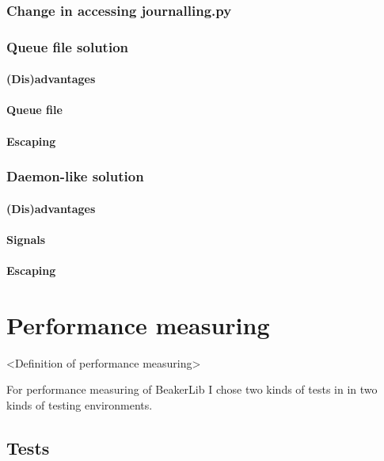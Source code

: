 \subsection{Change in accessing journalling.py}

\subsection{Queue file solution}

\subsubsection{(Dis)advantages}

\subsubsection{Queue file}

\subsubsection{Escaping}


\subsection{Daemon-like solution}

\subsubsection{(Dis)advantages}

\subsubsection{Signals}

\subsubsection{Escaping}



\chapter{Performance measuring}
<Definition of performance measuring>

For performance measuring of BeakerLib I chose two kinds of tests in in two kinds of testing environments.

\section{Tests}

